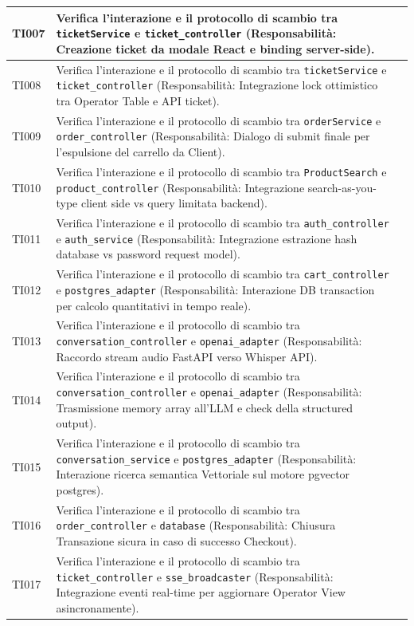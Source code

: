 \documentclass[a4paper,11pt,oneside]{scrartcl}
\begin{document}
\begin{longtable}{|p{1.9cm}|p{11.6cm}|c|}
TI007 & Verifica l'interazione e il protocollo di scambio tra \texttt{ticketService} e \texttt{ticket\_controller} (Responsabilità: Creazione ticket da modale React e binding server-side). & \\ \hline
TI008 & Verifica l'interazione e il protocollo di scambio tra \texttt{ticketService} e \texttt{ticket\_controller} (Responsabilità: Integrazione lock ottimistico tra Operator Table e API ticket). & \\ \hline
TI009 & Verifica l'interazione e il protocollo di scambio tra \texttt{orderService} e \texttt{order\_controller} (Responsabilità: Dialogo di submit finale per l'espulsione del carrello da Client). & \\ \hline
TI010 & Verifica l'interazione e il protocollo di scambio tra \texttt{ProductSearch} e \texttt{product\_controller} (Responsabilità: Integrazione search-as-you-type client side vs query limitata backend). & \\ \hline
TI011 & Verifica l'interazione e il protocollo di scambio tra \texttt{auth\_controller} e \texttt{auth\_service} (Responsabilità: Integrazione estrazione hash database vs password request model). & \\ \hline
TI012 & Verifica l'interazione e il protocollo di scambio tra \texttt{cart\_controller} e \texttt{postgres\_adapter} (Responsabilità: Interazione DB transaction per calcolo quantitativi in tempo reale). & \\ \hline
TI013 & Verifica l'interazione e il protocollo di scambio tra \texttt{conversation\_controller} e \texttt{openai\_adapter} (Responsabilità: Raccordo stream audio FastAPI verso Whisper API). & \\ \hline
TI014 & Verifica l'interazione e il protocollo di scambio tra \texttt{conversation\_controller} e \texttt{openai\_adapter} (Responsabilità: Trasmissione memory array all'LLM e check della structured output). & \\ \hline
TI015 & Verifica l'interazione e il protocollo di scambio tra \texttt{conversation\_service} e \texttt{postgres\_adapter} (Responsabilità: Interazione ricerca semantica Vettoriale sul motore pgvector postgres). & \\ \hline
TI016 & Verifica l'interazione e il protocollo di scambio tra \texttt{order\_controller} e \texttt{database} (Responsabilità: Chiusura Transazione sicura in caso di successo Checkout). & \\ \hline
TI017 & Verifica l'interazione e il protocollo di scambio tra \texttt{ticket\_controller} e \texttt{sse\_broadcaster} (Responsabilità: Integrazione eventi real-time per aggiornare Operator View asincronamente). & \\ \hline

\end{longtable}
\end{document}

